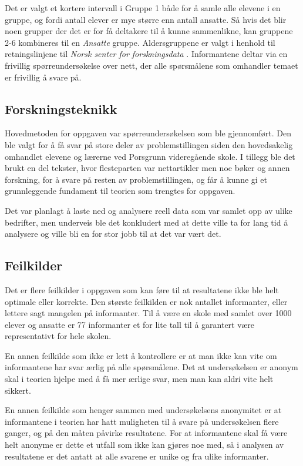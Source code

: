 Det er valgt et kortere intervall i Gruppe 1 både for å samle alle elevene i en gruppe, og fordi antall elever er mye større enn antall ansatte. Så hvis det blir noen grupper der det er for få deltakere til å kunne sammenlikne, kan gruppene 2-6 kombineres til en \textit{Ansatte} gruppe. Aldersgruppene er valgt i henhold til retningslinjene til \textit{Norsk senter for forskningsdata} \parencite{artikkel:nsd_forsknig}. Informantene deltar via en frivillig spørreundersøkelse over nett, der alle spørsmålene som omhandler temaet er frivillig å svare på. 
\vfill

\subsection{Forskningsteknikk}
Hovedmetoden for oppgaven var spørreundersøkelsen som ble gjennomført. Den ble valgt for å få svar på store deler av problemstillingen siden den hovedsakelig omhandlet elevene og lærerne ved Porsgrunn videregående skole. I tillegg ble det brukt en del tekster, hvor flesteparten var nettartikler men noe bøker og annen forskning, for å svare på resten av problemstillingen, og får å kunne gi et grunnleggende fundament til teorien som trengtes for oppgaven.

Det var planlagt å laste ned og analysere reell data som var samlet opp av ulike bedrifter, men underveis ble det konkludert med at dette ville ta for lang tid å analysere og ville bli en for stor jobb til at det var vært det.

\subsection{Feilkilder}
Det er flere feilkilder i oppgaven som kan føre til at resultatene ikke ble helt optimale eller korrekte. Den største feilkilden er nok antallet informanter, eller lettere sagt mangelen på informanter. Til å være en skole med samlet over 1000 elever og ansatte er 77 informanter et for lite tall til å garantert være representativt for hele skolen.

En annen feilkilde som ikke er lett å kontrollere er at man ikke kan vite om informantene har svar ærlig på alle spørsmålene. Det at undersøkelsen er anonym skal i teorien hjelpe med å få mer ærlige svar, men man kan aldri vite helt sikkert.

En annen feilkilde som henger sammen med undersøkelsens anonymitet er at informantene i teorien har hatt muligheten til å svare på undersøkelsen flere ganger, og på den måten påvirke resultatene. For at informantene skal få være helt anonyme er dette et utfall som ikke kan gjøres noe med, så i analysen av resultatene er det antatt at alle svarene er unike og fra ulike informanter.

\newpage